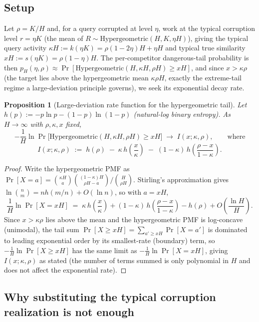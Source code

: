 \documentclass[11pt]{article}
\newtheorem{proposition}{Proposition}
\begin{document}
\subsection{Setup}

Let $\rho=K/H$ and, for a query corrupted at level $\eta$, work at the typical corruption level
$r=\eta K$ (the mean of $R\sim\mathrm{Hypergeometric}(H,K,\eta H)$), giving the typical query
activity $\kappa H := k(\eta K) = \rho(1-2\eta)H+\eta H$ and typical true similarity
$xH := s(\eta K) = \rho(1-\eta)H$. The per-competitor dangerous-tail probability is then
$p_H(\eta,\rho) \approx \Pr[\mathrm{Hypergeometric}(H,\kappa H,\rho H)\ge xH]$, and since $x>\kappa\rho$
(the target lies above the hypergeometric mean $\kappa\rho H$, exactly the extreme-tail regime a
large-deviation principle governs), we seek its exponential decay rate.

\begin{proposition}[Large-deviation rate function for the hypergeometric tail]
\label{prop:ratefunction}
Let $h(p):=-p\ln p-(1-p)\ln(1-p)$ (natural-log binary entropy). As $H\to\infty$ with $\rho,\kappa,x$
fixed,
\[
-\frac{1}{H}\ln \Pr\big[\mathrm{Hypergeometric}(H,\kappa H,\rho H)\ge xH\big] \;\longrightarrow\; I(x;\kappa,\rho), \qquad\text{where}
\]
\[
I(x;\kappa,\rho) \;:=\; h(\rho) \;-\; \kappa\,h\!\left(\frac{x}{\kappa}\right) \;-\; (1-\kappa)\,h\!\left(\frac{\rho-x}{1-\kappa}\right).
\]
\end{proposition}

\begin{proof}
Write the hypergeometric PMF as $\Pr[X=a] = \binom{\kappa H}{a}\binom{(1-\kappa)H}{\rho H-a}/\binom{H}{\rho H}$.
Stirling's approximation gives $\ln\binom{n}{m}=nh(m/n)+O(\ln n)$, so with $a=xH$,
\[
\frac{1}{H}\ln\Pr[X=xH] \;=\; \kappa\,h\!\left(\frac{x}{\kappa}\right) + (1-\kappa)\,h\!\left(\frac{\rho-x}{1-\kappa}\right) - h(\rho) + O\!\left(\frac{\ln H}{H}\right).
\]
Since $x>\kappa\rho$ lies above the mean and the hypergeometric PMF is log-concave (unimodal), the
tail sum $\Pr[X\ge xH]=\sum_{a'\ge xH}\Pr[X=a']$ is dominated to leading exponential order by its
smallest-rate (boundary) term, so $-\frac1H\ln\Pr[X\ge xH]$ has the same limit as
$-\frac1H\ln\Pr[X=xH]$, giving $I(x;\kappa,\rho)$ as stated (the number of terms summed is only
polynomial in $H$ and does not affect the exponential rate).
\end{proof}

\subsection{Why substituting the typical corruption realization is not enough}
\label{sec:typical-r-pitfall}
\end{document}
